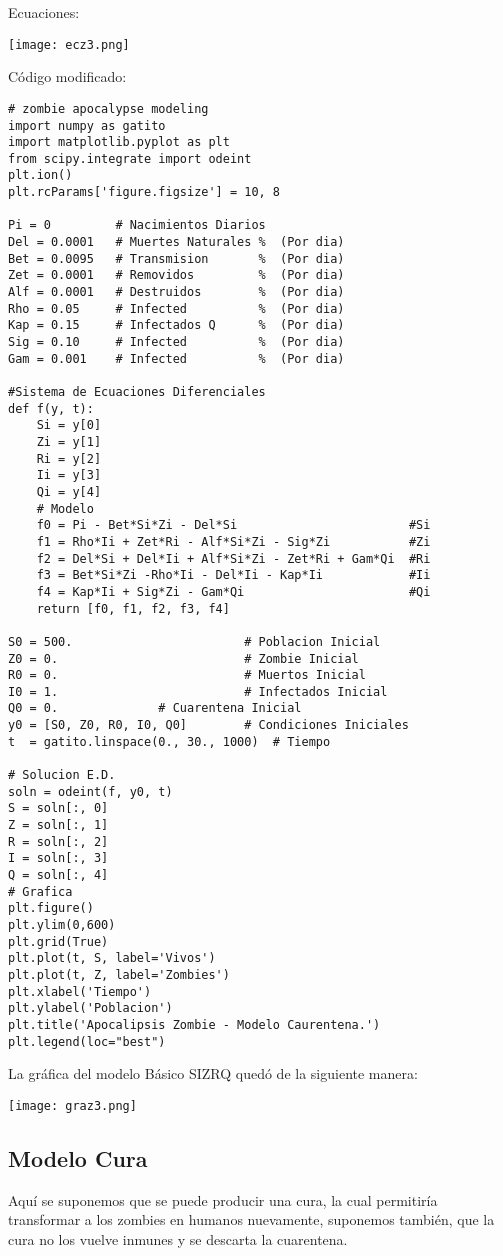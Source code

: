 \documentclass[12pt,letterpaper]{article}
\begin{document}
Ecuaciones:
\begin{center}
\texttt{[image: ecz3.png]}
\end{center}

C\'odigo modificado:
\begin{verbatim}
# zombie apocalypse modeling
import numpy as gatito
import matplotlib.pyplot as plt
from scipy.integrate import odeint
plt.ion()
plt.rcParams['figure.figsize'] = 10, 8

Pi = 0         # Nacimientos Diarios
Del = 0.0001   # Muertes Naturales %  (Por dia)
Bet = 0.0095   # Transmision       %  (Por dia)
Zet = 0.0001   # Removidos         %  (Por dia)
Alf = 0.0001   # Destruidos        %  (Por dia)
Rho = 0.05     # Infected          %  (Por dia)
Kap = 0.15     # Infectados Q      %  (Por dia)
Sig = 0.10     # Infected          %  (Por dia)
Gam = 0.001    # Infected          %  (Por dia)

#Sistema de Ecuaciones Diferenciales 
def f(y, t):
    Si = y[0]
    Zi = y[1]
    Ri = y[2]
    Ii = y[3]
    Qi = y[4]
    # Modelo
    f0 = Pi - Bet*Si*Zi - Del*Si                        #Si
    f1 = Rho*Ii + Zet*Ri - Alf*Si*Zi - Sig*Zi           #Zi
    f2 = Del*Si + Del*Ii + Alf*Si*Zi - Zet*Ri + Gam*Qi  #Ri
    f3 = Bet*Si*Zi -Rho*Ii - Del*Ii - Kap*Ii            #Ii
    f4 = Kap*Ii + Sig*Zi - Gam*Qi                       #Qi
    return [f0, f1, f2, f3, f4]

S0 = 500.                        # Poblacion Inicial
Z0 = 0.                          # Zombie Inicial
R0 = 0.                          # Muertos Inicial
I0 = 1.                          # Infectados Inicial
Q0 = 0.				 # Cuarentena Inicial
y0 = [S0, Z0, R0, I0, Q0]        # Condiciones Iniciales
t  = gatito.linspace(0., 30., 1000)  # Tiempo

# Solucion E.D.
soln = odeint(f, y0, t)
S = soln[:, 0]
Z = soln[:, 1]
R = soln[:, 2]
I = soln[:, 3]
Q = soln[:, 4]
# Grafica
plt.figure()
plt.ylim(0,600)
plt.grid(True)
plt.plot(t, S, label='Vivos')
plt.plot(t, Z, label='Zombies')
plt.xlabel('Tiempo')
plt.ylabel('Poblacion')
plt.title('Apocalipsis Zombie - Modelo Caurentena.')
plt.legend(loc="best")
\end{verbatim}

\newpage
La gr\'afica del modelo B\'asico SIZRQ qued\'o de la siguiente manera:

\begin{center}
\texttt{[image: graz3.png]} 
\end{center}

\subsection*{Modelo Cura}
Aqu\'i se suponemos que se puede producir una cura, la cual permitir\'ia transformar a los zombies en humanos nuevamente, suponemos tambi\'en, que la cura no los vuelve inmunes y se descarta la cuarentena.
\end{document}
